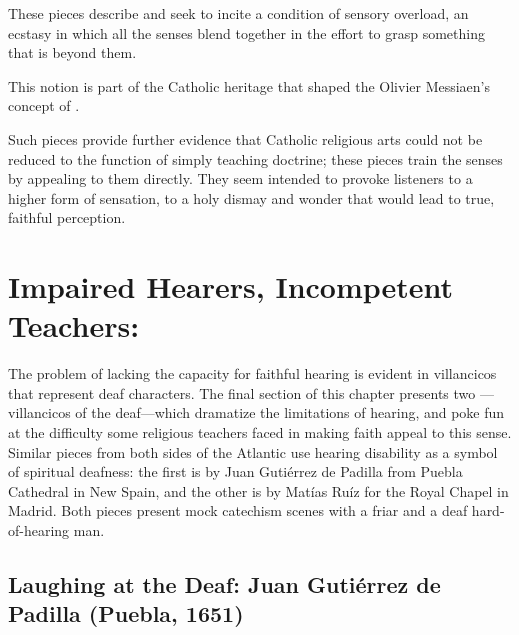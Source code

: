 These pieces describe and seek to incite a condition of sensory overload, an ecstasy in which all the senses blend together in the effort to grasp something that is beyond them.%
  \begin{Footnote}
      This notion is part of the Catholic heritage that shaped the Olivier Messiaen's concept of .
  \end{Footnote}
Such pieces provide further evidence that Catholic religious arts could not be reduced to the function of simply teaching doctrine; these pieces train the senses by appealing to them directly.
They seem intended to provoke listeners to a higher form of sensation, to a holy dismay and wonder that would lead to true, faithful perception.

\section{Impaired Hearers, Incompetent Teachers: }

The problem of lacking the capacity for faithful hearing is evident in
villancicos that represent deaf characters.
The final section of this chapter presents two ---villancicos of the deaf---which dramatize the limitations of hearing, and poke fun at the difficulty some religious teachers faced in making faith appeal to this sense.
Similar pieces from both sides of the Atlantic use hearing disability as a symbol of spiritual deafness: the first is by Juan Gutiérrez de Padilla from Puebla Cathedral in New Spain, and the other is by Matías Ruíz for the Royal Chapel in Madrid.
Both pieces present mock catechism scenes with a friar and a deaf hard-of-hearing man.

\subsection{Laughing at the Deaf: Juan Gutiérrez de Padilla (Puebla, 1651)}

